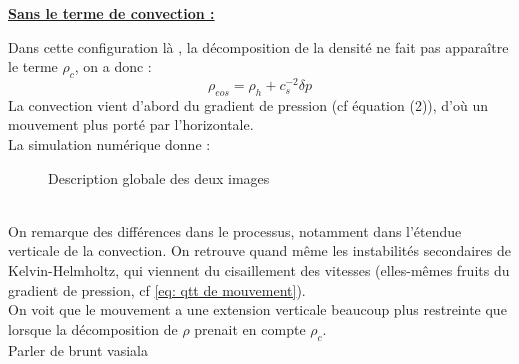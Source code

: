 \documentclass{rapportECC}
\begin{document}
\underline{\textbf{Sans le terme de convection :}} 
\label{sans rhoc}
\vspace{0.5 cm}

Dans cette configuration là , la décomposition de la densité ne fait pas apparaître le terme $\rho_c$, on a donc :
\begin{equation}
    \rho_{eos} = \rho_h + c_s^{-2}\delta p
\end{equation}
La convection vient d'abord du gradient de pression (cf équation (2)), d'où un mouvement plus porté par l'horizontale. 
\\
La simulation numérique donne :

\begin{figure}[H]
    \centering
    \hfill
    \caption{Description globale des deux images}
    \label{fig:images_cote_a_cote}
\end{figure}
\\
On remarque des différences dans le processus, notamment dans l'étendue verticale de la convection. On retrouve quand même les instabilités secondaires de Kelvin-Helmholtz, qui viennent du cisaillement des vitesses (elles-mêmes fruits du gradient de pression, cf \eqref{eq: qtt de mouvement}).
\\
On voit que le mouvement a une extension verticale beaucoup plus restreinte que lorsque la décomposition de $\rho$ prenait en compte $\rho_c$.
\\
Parler de brunt vasiala
\end{document}

